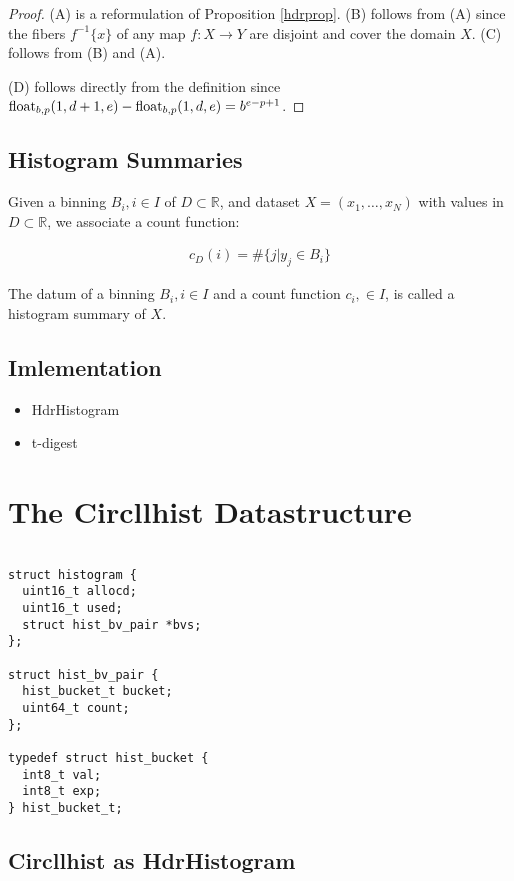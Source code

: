 \documentclass{article}
\theoremstyle{plain}
\theoremstyle{remark}
\newcommand{\IR}{\mathbb{R}}
\begin{document}
\begin{proof}
  (A) is a reformulation of Proposition \ref{hdrprop}.
  (B) follows from (A) since the fibers $f^{-1}\{x\}$ of any map $f:X \rightarrow Y$ are disjoint and cover the domain $X$.
  (C) follows from (B) and (A).

  (D) follows directly from the definition since $\mathrm{float}_{b,p}(1,d+1,e)-\mathrm{float}_{b,p}(1,d,e) = b^{e-p+1}$.
\end{proof}

\subsection{Histogram Summaries}
Given a binning $B_i, i\in I$ of $D \subset \IR$, and  dataset $X=(x_1,\dots, x_N) $ with values in
$D \subset \IR$, we associate a count function:

\begin{align*} c_D(i) = \# \{ j | y_j \in B_i \} \end{align*}

The datum of a binning $B_i,i\in I$ and a count function $c_i,\in I$, is called a histogram summary of $X$.

\subsection{Imlementation}

\begin{itemize}
\item HdrHistogram
\item t-digest
\end{itemize}

\section{The Circllhist Datastructure}
\begin{verbatim}

struct histogram {
  uint16_t allocd;
  uint16_t used;
  struct hist_bv_pair *bvs;
};

struct hist_bv_pair {
  hist_bucket_t bucket;
  uint64_t count;
};

typedef struct hist_bucket {
  int8_t val;
  int8_t exp;
} hist_bucket_t;
\end{verbatim}

\subsection{Circllhist as HdrHistogram}
\end{document}
